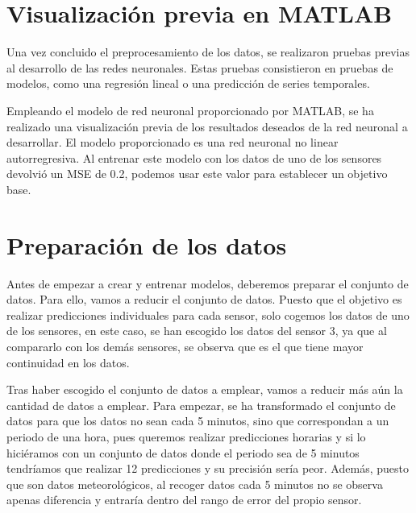 
\section{Visualización previa en MATLAB}

Una vez concluido el preprocesamiento de los datos, se realizaron pruebas previas al desarrollo de las redes neuronales. Estas pruebas consistieron en pruebas de modelos, como una regresión lineal o una predicción de series temporales.

\par

Empleando el modelo de red neuronal proporcionado por MATLAB, se ha realizado una visualización previa de los resultados deseados de la red neuronal a desarrollar. El modelo proporcionado es una red neuronal no linear autorregresiva. Al entrenar este modelo con los datos de uno de los sensores devolvió un MSE de 0.2, podemos usar este valor para establecer un objetivo base.

\section{Preparación de los datos}

Antes de empezar a crear y entrenar modelos, deberemos preparar el conjunto de datos. Para ello, vamos a reducir el conjunto de datos. Puesto que el objetivo es realizar predicciones individuales para cada sensor, solo cogemos los datos de uno de los sensores, en este caso, se han escogido los datos del sensor 3, ya que al compararlo con los demás sensores, se observa que es el que tiene mayor continuidad en los datos.

\par

Tras haber escogido el conjunto de datos a emplear, vamos a reducir más aún la cantidad de datos a emplear. Para empezar, se ha transformado el conjunto de datos para que los datos no sean cada 5 minutos, sino que correspondan a un periodo de una hora, pues queremos realizar predicciones horarias y si lo hiciéramos con un conjunto de datos donde el periodo sea de 5 minutos tendríamos que realizar 12 predicciones y su precisión sería peor. Además, puesto que son datos meteorológicos, al recoger datos cada 5 minutos no se observa apenas diferencia y entraría dentro del rango de error del propio sensor.

\par


